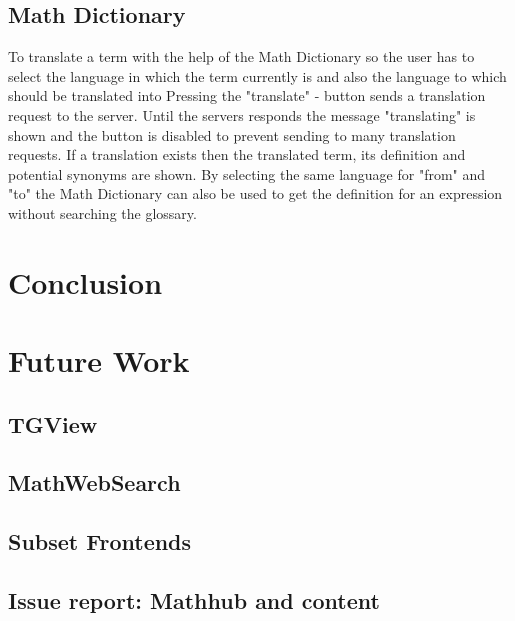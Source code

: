 \documentclass[11pt,a4paper]{article}
\begin{document}
 	\subsection{Math Dictionary}
To translate a term with the help of the Math Dictionary so the user has to select the language in which the term currently is and also the language to which should be translated into
Pressing the "translate" - button sends a translation request to the server.
Until the servers responds the message "translating" is shown and the button is disabled to prevent sending to many translation requests.
If a translation exists then the translated term, its definition and potential synonyms are shown.
By selecting the same language for "from" and "to" the Math Dictionary can also be used to get the definition for an expression without searching the glossary.

\section{Conclusion}

\section{Future Work}
	\subsection{TGView}
	\subsection{MathWebSearch}
	\subsection{Subset Frontends}
	\subsection{Issue report: Mathhub and content}

\printbibliography
{}
\end{document}
